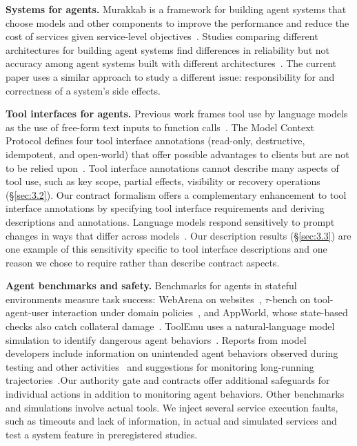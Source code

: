 \documentclass[letterpaper,twocolumn,10pt]{article}
\begin{document}
\textbf{Systems for agents.} Murakkab is a framework for building agent systems that choose models and other components to improve the performance and reduce the cost of services given service-level objectives~\cite{chaudhry2026murakkab}. Studies comparing different architectures for building agent systems find differences in reliability but not accuracy among agent systems built with different architectures~\cite{kim2025scaling}. The current paper uses a similar approach to study a different issue: responsibility for and correctness of a system's side effects.

\textbf{Tool interfaces for agents.} Previous work frames tool use by language models as the use of free-form text inputs to function calls~\cite{schick2023toolformer,yao2023react}. The Model Context Protocol defines four tool interface annotations (read-only, destructive, idempotent, and open-world) that offer possible advantages to clients but are not to be relied upon~\cite{mcp}. Tool interface annotations cannot describe many aspects of tool use, such as key scope, partial effects, visibility or recovery operations (\S\ref{sec:3.2}). Our contract formalism offers a complementary enhancement to tool interface annotations by specifying tool interface requirements and deriving descriptions and annotations. Language models respond sensitively to prompt changes in ways that differ across models~\cite{sclar2024formatting}. Our description results (\S\ref{sec:3.3}) are one example of this sensitivity specific to tool interface descriptions and one reason we chose to require rather than describe contract aspects.

\textbf{Agent benchmarks and safety.} Benchmarks for agents in stateful environments measure task success: WebArena on websites~\cite{zhou2024webarena}, $\tau$-bench on tool-agent-user interaction under domain policies~\cite{yao2025taubench}, and AppWorld, whose state-based checks also catch collateral damage~\cite{trivedi2024appworld}. ToolEmu uses a natural-language model simulation to identify dangerous agent behaviors~\cite{ruan2024toolemu}. Reports from model developers include information on unintended agent behaviors observed during testing and other activities~\cite{anthropic2026unintended} and suggestions for monitoring long-running trajectories~\cite{openai2026longhorizon}.Our authority gate and contracts offer additional safeguards for individual actions in addition to monitoring agent behaviors. Other benchmarks and simulations involve actual tools. We inject several service execution faults, such as timeouts and lack of information, in actual and simulated services and test a system feature in preregistered studies.
\end{document}

